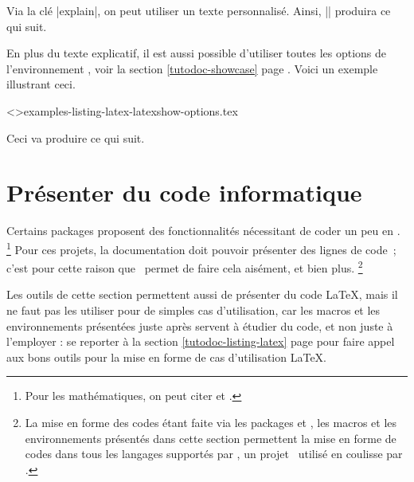 \begin{tdocexa}
    Via la clé \tdoclatexin|explain|, on peut utiliser un texte personnalisé. Ainsi, \tdoclatexin|| produira ce qui suit.

    \smallskip

\end{tdocexa}


\begin{tdocexa}
    En plus du texte explicatif, il est aussi possible d'utiliser toutes les options de l'environnement , voir la section \ref{tutodoc-showcase} page \pageref{tutodoc-showcase}.
    Voici un exemple illustrant ceci.

    \medskip

    \tdoclatexinput<>{examples-listing-latex-latexshow-options.tex}

    \smallskip

    Ceci va produire ce qui suit.

    \smallskip

    
\end{tdocexa}


\section{Présenter du code informatique}

Certains packages proposent des fonctionnalités nécessitant de coder un peu en \lua.%
\footnote{
	Pour les mathématiques, on peut citer  et .
}
Pour ces projets, la documentation doit pouvoir présenter des lignes de code \lua\,; c'est pour cette raison que \thisproj\ permet de faire cela aisément, et bien plus.%
\footnote{
    La mise en forme des codes étant faite via les packages  et , les macros et les environnements présentés dans cette section permettent la mise en forme de codes dans tous les langages supportés par \pygmentsREF, un projet \python\ utilisé en coulisse par .
}


\begin{tdocimp}
	Les outils de cette section permettent aussi de présenter du code \LaTeX, mais il ne faut pas les utiliser pour de simples cas d'utilisation, car les macros et les environnements présentées juste après servent à étudier du code, et non juste à l'employer : se reporter à la section \ref{tutodoc-listing-latex} page \pageref{tutodoc-listing-latex} pour faire appel aux bons outils pour la mise en forme de cas d'utilisation \LaTeX.
\end{tdocimp}




